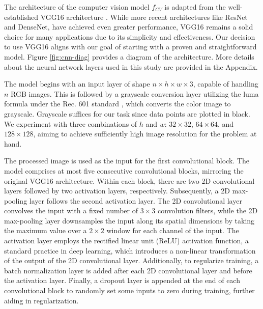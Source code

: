 \documentclass[]{interact}
\theoremstyle{plain}%
\theoremstyle{definition}
\theoremstyle{remark}
\begin{document}
The architecture of the computer vision model \(f_{CV}\) is adapted from
the well-established VGG16 architecture \citep{simonyan2014very}. While
more recent architectures like ResNet \citep{he2016deep} and
DenseNet\citep{huang2017densely}, have achieved even greater
performance, VGG16 remains a solid choice for many applications due to
its simplicity and effectiveness. Our decision to use VGG16 aligns with
our goal of starting with a proven and straightforward model. Figure
\ref{fig:cnn-diag} provides a diagram of the architecture. More details
about the neural network layers used in this study are provided in the
Appendix.

The model begins with an input layer of shape
\(n \times h \times w \times 3\), capable of handling \(n\) RGB images.
This is followed by a grayscale conversion layer utilizing the luma
formula under the Rec. 601 standard \citep{series2011studio}, which
converts the color image to grayscale. Grayscale suffices for our task
since data points are plotted in black. We experiment with three
combinations of \(h\) and \(w\): \(32 \times 32\), \(64 \times 64\), and
\(128 \times 128\), aiming to achieve sufficiently high image resolution
for the problem at hand.

The processed image is used as the input for the first convolutional
block. The model comprises at most five consecutive convolutional
blocks, mirroring the original VGG16 architecture. Within each block,
there are two 2D convolutional layers followed by two activation layers,
respectively. Subsequently, a 2D max-pooling layer follows the second
activation layer. The 2D convolutional layer convolves the input with a
fixed number of \(3 \times 3\) convolution filters, while the 2D
max-pooling layer downsamples the input along its spatial dimensions by
taking the maximum value over a \(2 \times 2\) window for each channel
of the input. The activation layer employs the rectified linear unit
(ReLU) activation function, a standard practice in deep learning, which
introduces a non-linear transformation of the output of the 2D
convolutional layer. Additionally, to regularize training, a batch
normalization layer is added after each 2D convolutional layer and
before the activation layer. Finally, a dropout layer is appended at the
end of each convolutional block to randomly set some inputs to zero
during training, further aiding in regularization.
\end{document}
